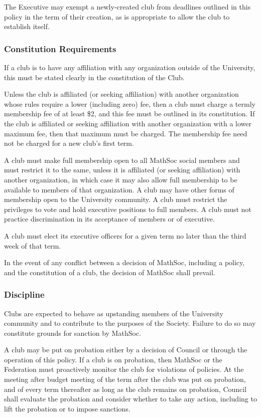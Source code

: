 The Executive may exempt a newly-created club from deadlines outlined in this
policy in the term of their creation, as is appropriate to allow the club to
establish itself.

\subsubsection{Constitution Requirements}
If a club is to have any affiliation with any organization outside of the
University, this must be stated clearly in the constitution of the Club.

Unless the club is affiliated (or seeking affiliation) with another organization
whose rules require a lower (including zero) fee, then a club must charge a
termly membership fee of at least \$2, and this fee must be outlined in its
constitution. If the club is affiliated or seeking affiliation with another
organization with a lower maximum fee, then that maximum must be charged. The
membership fee need not be charged for a new club's first term.

A club must make full membership open to all MathSoc social members and must
restrict it to the same, unless it is affiliated (or seeking affiliation) with
another organization, in which case it may also allow full membership to be
available to members of that organization. A club may have other forms of
membership open to the University community. A club must restrict the privileges
to vote and hold executive positions to full members. A club must not practice
discrimination in its acceptance of members or of executive.

A club must elect its executive officers for a given term no later than the
third week of that term.

In the event of any conflict between a decision of MathSoc, including a policy,
and the constitution of a club, the decision of MathSoc shall prevail.

\subsubsection{Discipline}
Clubs are expected to behave as upstanding members of the University community
and to contribute to the purposes of the Society. Failure to do so may
constitute grounds for sanction by MathSoc.

A club may be put on probation either by a decision of Council or through the
operation of this policy. If a club is on probation, then MathSoc or the
Federation must proactively monitor the club for violations of policies. At the
meeting after budget meeting of the term after the club was put on probation,
and of every term thereafter as long as the club remains on probation, Council
shall evaluate the probation and consider whether to take any action, including
to lift the probation or to impose sanctions.

